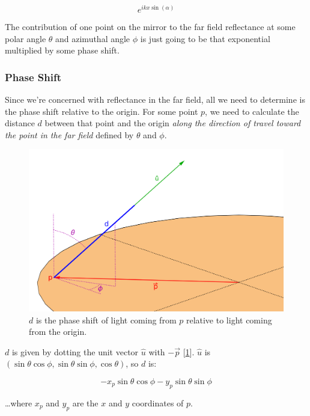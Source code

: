 \documentclass[etd,oneside,senior]{BYUPhys}
\begin{document}
\begin{equation}
  e^{ikx\sin\left({\alpha}\right)}
\end{equation}

The contribution of one point on the mirror to the far field reflectance at some polar angle $\theta$ and azimuthal angle $\phi$ is just going to be that exponential multiplied by some phase shift.

\subsubsection{Phase Shift}
Since we're concerned with reflectance in the far field, all we need to determine is the phase shift relative to the origin. For some point $p$, we need to calculate the distance $d$ between that point and the origin \textit{along the direction of travel toward the point in the far field} defined by $\theta$ and $\phi$.

\begin{figure}
  \centerline{\includegraphics[width=\textwidth]{phase-length}}
  \caption[Phase length of a beam of light]{\label{fig:phase_length}
    $d$ is the phase shift of light coming from $p$ relative to light coming from the origin.}
\end{figure}

$d$ is given by dotting the unit vector $\hat{u}$ with $-\vec{p}$ [\ref{fig:phase_length}]. $\hat{u}$ is $\left(\sin{\theta}\cos{\phi},\sin{\theta}\sin{\phi},\cos{\theta}\right)$, so $d$ is:

\begin{equation}
  -x_p\sin{\theta}\cos{\phi}-y_p\sin{\theta}\sin{\phi}
\end{equation}

\ldots where $x_p$ and $y_p$ are the $x$ and $y$ coordinates of $p$.
\end{document}
